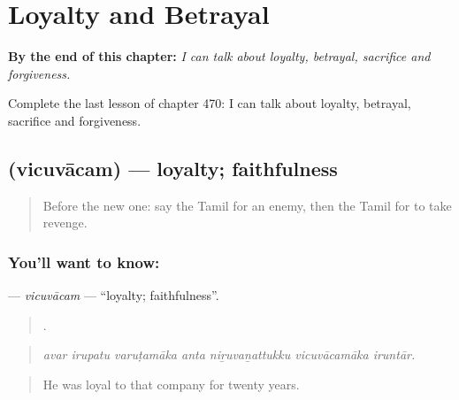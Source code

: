 
\chapter{Loyalty and Betrayal}
\label{ch:ta-loyalty-and-betrayal}

\begin{chapteropening}
\textbf{By the end of this chapter:} \emph{I can talk about loyalty, betrayal, sacrifice and forgiveness.}

Complete the last lesson of chapter 470: I can talk about loyalty, betrayal, sacrifice and forgiveness.
\end{chapteropening}

\section[\texorpdfstring{\ta{விசுவாசம்} (vicuvācam)}{விசுவாசம் (vicuvācam)}]{ (vicuvācam) — loyalty; faithfulness}

\label{lesson:TA-C470-vicuvacam}



\begin{quote}
Before the new one: say the Tamil for an enemy, then the Tamil for to take revenge.
\end{quote}

\subsection*{You'll want to know: }
\textbf{} — \emph{vicuvācam} — \textquotedblleft{}loyalty; faithfulness\textquotedblright{}.

\begin{quote}
      .
\end{quote}

\begin{quote}
\emph{avar irupatu varuṭamāka anta niṟuvaṉattukku vicuvācamāka iruntār.}
\end{quote}

\begin{quote}
He was loyal to that company for twenty years.
\end{quote}

